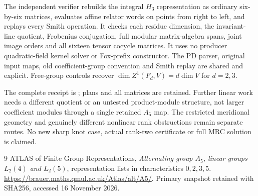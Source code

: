 \documentclass[11pt]{article}
\begin{document}
The independent verifier rebuilds the integral $H_3$ representation
as ordinary six-by-six matrices, evaluates affine relator words on
points from right to left, and replays every Smith operation. It
checks each residue dimension, the invariant-line quotient,
Frobenius conjugation, full modular matrix-algebra spans, joint
image orders and all sixteen tensor cocycle matrices. It uses no
producer quadratic-field kernel solver or Fox-prefix constructor.
The PD parser, original input maps, old coefficient-group convention
and Smith replay are shared and explicit. Free-group controls recover
$\dim Z^1(F_d,V)=d\dim V$ for $d=2,3$.

The complete receipt is ;
plans and all matrices are retained. Further linear work needs a
different quotient or an untested product-module structure, not
larger coefficient modules through a single retained $A_5$ map.
The restricted meridional geometry and genuinely different
nonlinear rank obstructions remain separate routes. No new sharp
knot case, actual rank-two certificate or full MRC solution is claimed.

\begin{thebibliography}{9}
 ATLAS of Finite Group Representations,
\emph{Alternating group $A_5$, linear groups $L_2(4)$ and $L_2(5)$},
representation lists in characteristics $0,2,3,5$.
\url{https://brauer.maths.qmul.ac.uk/Atlas/alt/A5/}.
Primary snapshot retained with SHA256, accessed 16 November 2026.
\end{thebibliography}
\end{document}
